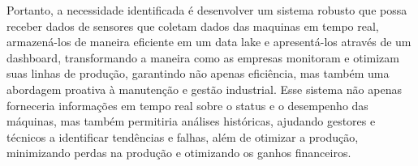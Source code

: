 Portanto, a necessidade identificada é desenvolver um sistema robusto que possa receber dados de sensores que coletam dados das maquinas em tempo real, armazená-los de maneira eficiente em um data lake e apresentá-los através de um dashboard, transformando a maneira como as empresas monitoram e otimizam suas linhas de produção, garantindo não apenas eficiência, mas também uma abordagem proativa à manutenção e gestão industrial. Esse sistema não apenas forneceria informações em tempo real sobre o status e o desempenho das máquinas, mas também permitiria análises históricas, ajudando gestores e técnicos a identificar tendências e falhas, além de otimizar a produção, minimizando perdas na produção e otimizando os ganhos financeiros.

